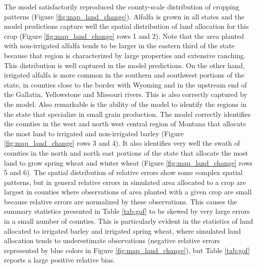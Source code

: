 The model satisfactorily reproduced the county-scale distribution of cropping patterns (Figure \ref{fig:map_land_change}). Alfalfa is grown in all states and the model predictions capture well the spatial distribution of land allocation for this crop (Figure \ref{fig:map_land_change} rows 1 and 2). Note that the area planted with non-irrigated alfalfa tends to be larger in the eastern third of the state because that region is characterized by large properties and extensive ranching. This distribution is well captured in the model predictions. On the other hand, irrigated alfalfa is more common in the southern and southwest portions of the state, in counties close to the border with Wyoming and in the upstream end of the Gallatin, Yellowstone and Missouri rivers. This is also correctly captured by the model. Also remarkable is the ability of the model to identify the regions in the state that specialize in small grain production. The model correctly identifies the counties in the west and north west central region of Montana that allocate the most land to irrigated and non-irrigated barley (Figure \ref{fig:map_land_change} rows 3 and 4). It also identifies very well the swath of counties in the north and north east portions of the state that allocate the most land to grow spring wheat and winter wheat (Figure \ref{fig:map_land_change} rows 5 and 6). The spatial distribution of relative errors show some complex spatial patterns, but in general relative errors in simulated area allocated to a crop are largest in counties where observations of area planted with a given crop are small because relative errors are normalized by these observations. This causes the summary statistics presented in Table \ref{tab:gof} to be skewed by very large errors in a small number of counties. This is particularly evident in the statistics of land allocated to irrigated barley and irrigated spring wheat, where simulated land allocation tends to underestimate observations (negative relative errors represented by blue colors in Figure \ref{fig:map_land_change}), but Table \ref{tab:gof} reports a large positive relative bias.     
 
